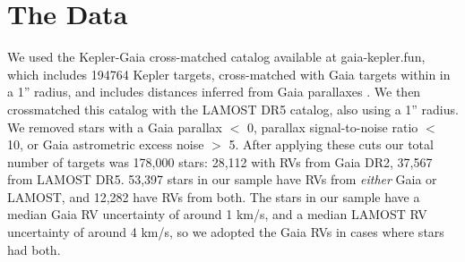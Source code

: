 \section{The Data}
\label{sec:data}

We used the Kepler-Gaia cross-matched catalog available at gaia-kepler.fun,
which includes 194764 Kepler targets, cross-matched with Gaia targets within
in a 1'' radius, and includes distances inferred from Gaia parallaxes
\citep{bailer-jones2018}.
We then crossmatched this catalog with the LAMOST DR5 catalog, also using a
1'' radius.
We removed stars with a Gaia parallax $<$ 0, parallax signal-to-noise ratio
$<$ 10, or Gaia astrometric excess noise $>$ 5.
After applying these cuts our total number of targets was 178,000 stars:
28,112 with RVs from Gaia DR2, 37,567 from LAMOST DR5.
53,397 stars in our sample have RVs from {\it either} Gaia or LAMOST, and
12,282 have RVs from both.
The stars in our sample have a median Gaia RV uncertainty of around 1 km/s,
and a median LAMOST RV uncertainty of around 4 km/s, so we adopted the Gaia
RVs in cases where stars had both.

